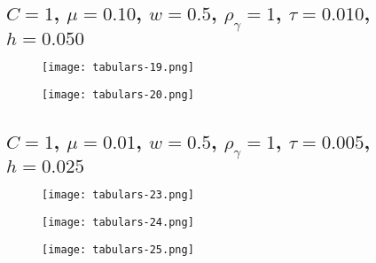 \subsection{$C = 1$, $\mu = 0.10$, $w = 0.5$, $\rho_\gamma = 1$, $\tau = 0.010$, $h = 0.050$}

\begin{figure}[h!] \centering \texttt{[image: tabulars-19.png]} \end{figure} \newpage
\begin{figure}[h!] \centering \texttt{[image: tabulars-20.png]} \end{figure} \newpage

\subsection{$C = 1$, $\mu = 0.01$, $w = 0.5$, $\rho_\gamma = 1$, $\tau = 0.005$, $h = 0.025$}
\begin{figure}[h!] \centering \texttt{[image: tabulars-23.png]} \end{figure} \newpage
\begin{figure}[h!] \centering \texttt{[image: tabulars-24.png]} \end{figure} \newpage
\begin{figure}[h!] \centering \texttt{[image: tabulars-25.png]} \end{figure} \newpage

\newpage

%

